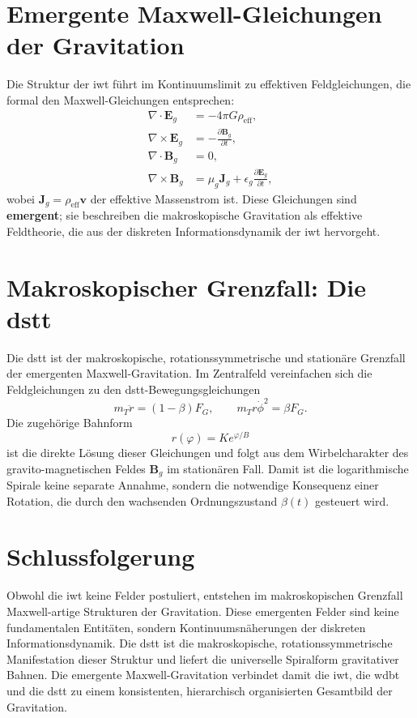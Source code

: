 \section{Emergente Maxwell-Gleichungen der Gravitation}
Die Struktur der \gls{iwt} führt im Kontinuumslimit zu effektiven Feldgleichungen, die formal den Maxwell-Gleichungen entsprechen:
\[
\begin{aligned}
\nabla \cdot \mathbf{E}_g &= -4\pi G \rho_{\mathrm{eff}}, \\
\nabla \times \mathbf{E}_g &= -\frac{\partial \mathbf{B}_g}{\partial t}, \\
\nabla \cdot \mathbf{B}_g &= 0, \\
\nabla \times \mathbf{B}_g &= \mu_g \mathbf{J}_g + \epsilon_g \frac{\partial \mathbf{E}_g}{\partial t},
\end{aligned}
\]
wobei $\mathbf{J}_g = \rho_{\mathrm{eff}} \mathbf{v}$ der effektive Massenstrom ist. Diese Gleichungen sind \textbf{emergent}; sie beschreiben die makroskopische Gravitation als effektive Feldtheorie, die aus der diskreten Informationsdynamik der \gls{iwt} hervorgeht.

\section{Makroskopischer Grenzfall: Die \gls{dstt}}
Die \gls{dstt} ist der makroskopische, rotationssymmetrische und stationäre Grenzfall der emergenten Maxwell-Gravitation. Im Zentralfeld vereinfachen sich die Feldgleichungen zu den \gls{dstt}-Bewegungsgleichungen
\[
m_T \ddot{r} = (1-\beta)F_G, \qquad m_T r\dot{\phi}^2 = \beta F_G.
\]
Die zugehörige Bahnform
\[
r(\varphi) = K e^{\varphi/B}
\]
ist die direkte Lösung dieser Gleichungen und folgt aus dem Wirbelcharakter des gravito-magnetischen Feldes $\mathbf{B}_g$ im stationären Fall.  
Damit ist die logarithmische Spirale keine separate Annahme, sondern die notwendige Konsequenz einer Rotation, die durch den wachsenden Ordnungszustand $\beta(t)$ gesteuert wird.

\section{Schlussfolgerung}
Obwohl die \gls{iwt} keine Felder postuliert, entstehen im makroskopischen Grenzfall Maxwell-artige Strukturen der Gravitation. Diese emergenten Felder sind keine fundamentalen Entitäten, sondern Kontinuumsnäherungen der diskreten Informationsdynamik. Die \gls{dstt} ist die makroskopische, rotationssymmetrische Manifestation dieser Struktur und liefert die universelle Spiralform gravitativer Bahnen. Die emergente Maxwell-Gravitation verbindet damit die \gls{iwt}, die \gls{wdbt} und die \gls{dstt} zu einem konsistenten, hierarchisch organisierten Gesamtbild der Gravitation.
